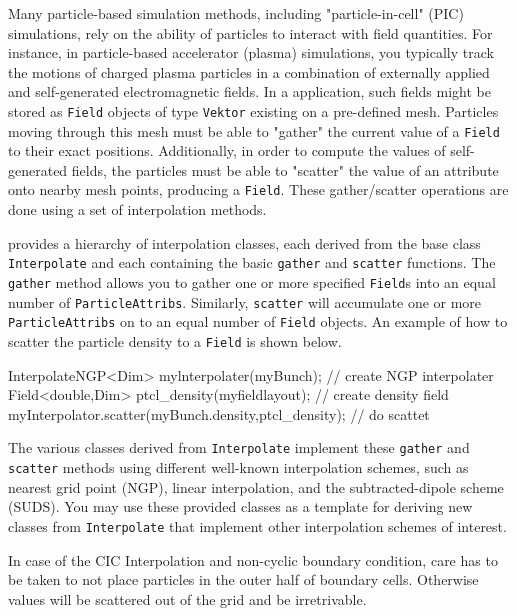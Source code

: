 
Many particle-based simulation methods, including "particle-in-cell" (PIC) simulations, rely on the ability of particles to interact with field quantities. For instance, in particle-based accelerator (plasma) simulations, you typically track the motions of charged plasma particles in a combination of externally applied and self-generated electromagnetic fields. In a \ippl application, such fields might be stored as \texttt{Field} objects of type \texttt{Vektor} existing on a pre-defined mesh. Particles moving through this mesh must be able to "gather" the current value of a \texttt{Field} to their exact positions. Additionally, in order to compute the values of self-generated fields, the particles must be able to "scatter" the value of an attribute onto nearby mesh points, producing a \texttt{Field}. These gather/scatter operations are done using a set of \ippl interpolation methods.

\ippl provides a hierarchy of interpolation classes, each derived from the base class \texttt{Interpolate} and each containing the basic \texttt{gather} and \texttt{scatter} functions. The \texttt{gather} method allows you to gather one or more specified \texttt{Field}s into an equal number of \texttt{ParticleAttribs}. Similarly, \texttt{scatter} will accumulate one or more \texttt{ParticleAttribs} on to an equal number of \texttt{Field} objects. An example of how to scatter the particle density to a \texttt{Field} is shown below.
\begin{smallcode}
InterpolateNGP<Dim> mylnterpolater(myBunch);           // create NGP interpolater 
Field<double,Dim> ptcl_density(myfieldlayout);         // create density field 
myInterpolator.scatter(myBunch.density,ptcl_density);  // do scattet 
\end{smallcode}
The various classes derived from \texttt{Interpolate} implement these \texttt{gather} and \texttt{scatter} methods using different well-known interpolation schemes, such as nearest grid point (NGP), linear interpolation, and the subtracted-dipole scheme (SUDS). You may use these provided classes as a template for deriving new classes from \texttt{Interpolate} that implement other interpolation schemes of interest.

In case of the CIC Interpolation and non-cyclic boundary condition, care has to be taken to not place particles in the outer half of boundary cells. Otherwise values will be scattered out of the grid and be irretrivable.
